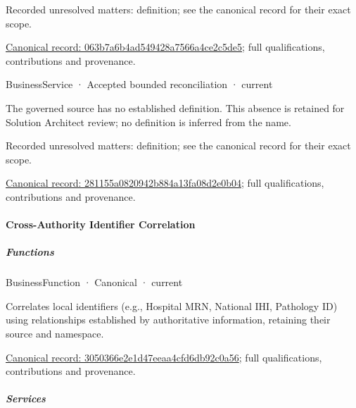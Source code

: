{\small Recorded unresolved matters: definition; see the canonical record for their exact scope.}\par
{\footnotesize \href{../../../../continuum/business/business-service/063b7a6b4ad549428a7566a4ce2c5de5.md}{Canonical record: 063b7a6b4ad549428a7566a4ce2c5de5}; full qualifications, contributions and provenance.}\par
{}


\label{element:281155a0820942b884a13fa08d2e0b04}
{\small BusinessService · Accepted bounded reconciliation · current}\par

The governed source has no established definition. This absence is retained for Solution Architect review; no definition is inferred from the name.


{\small Recorded unresolved matters: definition; see the canonical record for their exact scope.}\par
{\footnotesize \href{../../../../continuum/business/business-service/281155a0820942b884a13fa08d2e0b04.md}{Canonical record: 281155a0820942b884a13fa08d2e0b04}; full qualifications, contributions and provenance.}\par
\paragraph{Cross-Authority Identifier Correlation}

\subparagraph{Functions}



\label{element:3050366e2e1d47eeaa4cfd6db92c0a56}
{\small BusinessFunction · Canonical · current}\par

Correlates local identifiers (e.g., Hospital MRN, National IHI, Pathology ID) using relationships established by authoritative information, retaining their source and namespace.


{\footnotesize \href{../../../../continuum/business/business-function/3050366e2e1d47eeaa4cfd6db92c0a56.md}{Canonical record: 3050366e2e1d47eeaa4cfd6db92c0a56}; full qualifications, contributions and provenance.}\par
\subparagraph{Services}


